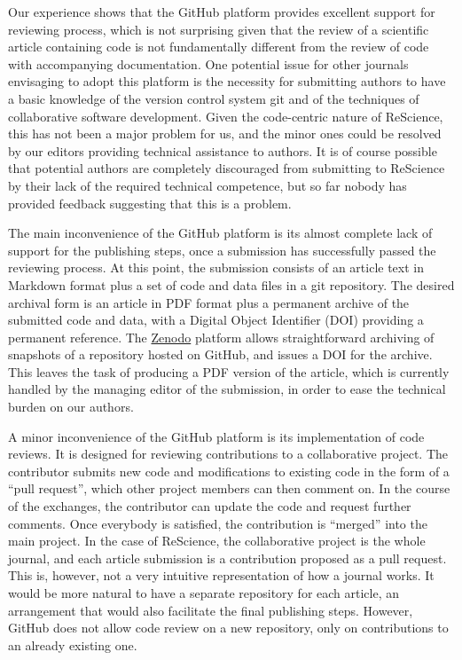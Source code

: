 \documentclass[a4paper,10pt, twocolumn]{article}
\begin{document}
Our experience shows that the GitHub platform provides excellent
support for reviewing process, which is not surprising given that the
review of a scientific article containing code is not fundamentally
different from the review of code with accompanying documentation.
One potential issue for other journals envisaging to adopt this
platform is the necessity for submitting authors to have a basic
knowledge of the version control system git and of the techniques of
collaborative software development. Given the code-centric nature of
ReScience, this has not been a major problem for us, and the minor
ones could be resolved by our editors providing technical assistance
to authors. It is of course possible that potential authors are
completely discouraged from submitting to ReScience by their lack
of the required technical competence, but so far nobody has
provided feedback suggesting that this is a problem.

The main inconvenience of the GitHub platform is its almost complete
lack of support for the publishing steps, once a submission has
successfully passed the reviewing process. At this point, the
submission consists of an article text in Markdown format plus a set
of code and data files in a git repository. The desired archival form
is an article in PDF format plus a permanent archive of the submitted
code and data, with a Digital Object Identifier (DOI) providing a
permanent reference. The \href{https://zenodo.org/}{Zenodo} platform
allows straightforward archiving of snapshots of a repository hosted
on GitHub, and issues a DOI for the archive. This leaves the task
of producing a PDF version of the article, which is currently handled
by the managing editor of the submission, in order to ease the technical
burden on our authors.

A minor inconvenience of the GitHub platform is its implementation of
code reviews. It is designed for reviewing contributions to a
collaborative project. The contributor submits new code and
modifications to existing code in the form of a ``pull request'',
which other project members can then comment on. In the course of the
exchanges, the contributor can update the code and request further
comments. Once everybody is satisfied, the contribution is ``merged''
into the main project. In the case of ReScience, the collaborative
project is the whole journal, and each article submission is a
contribution proposed as a pull request. This is, however, not a very
intuitive representation of how a journal works. It would be more
natural to have a separate repository for each article, an arrangement
that would also facilitate the final publishing steps. However, GitHub
does not allow code review on a new repository, only on contributions
to an already existing one.
\end{document}
